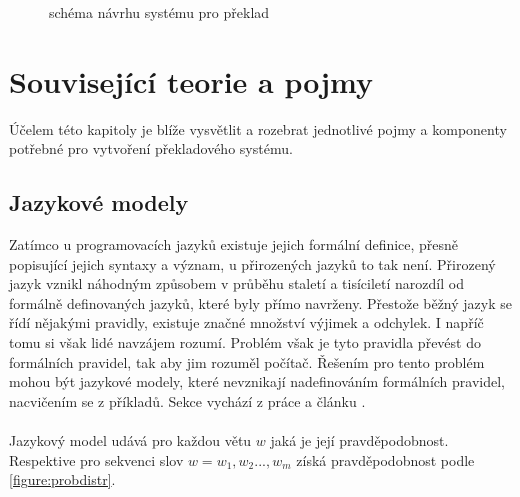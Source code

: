 \begin{figure}[h]
    \begin{center}
    \end{center}
	\caption{schéma návrhu systému pro překlad}
	\label{img:draft}
\end{figure}


\chapter{Související teorie a pojmy}
Účelem této kapitoly je blíže vysvětlit a rozebrat jednotlivé pojmy a komponenty potřebné pro vytvoření překladového systému.



\section{Jazykové modely}\label{section:langmodel}
Zatímco u programovacích jazyků existuje jejich formální definice, přesně popisující jejich syntaxy a význam, u přirozených jazyků to tak není. Přirozený jazyk vznikl náhodným způsobem v průběhu staletí a tisíciletí narozdíl od formálně definovaných jazyků, které byly přímo navrženy. Přestože běžný jazyk se řídí nějakými pravidly, existuje značné množství výjimek a odchylek. I napříč tomu si však lidé navzájem rozumí. Problém však je tyto pravidla převést do formálních pravidel, tak aby jim rozuměl počítač. Řešením pro tento problém mohou být jazykové modely, které nevznikají nadefinováním formálních pravidel, nacvičením se z příkladů. Sekce vychází z práce \cite{nmtThesis} a článku \cite{nmtTutorial}.
\\\\
Jazykový model udává pro každou větu $w$ jaká je její pravděpodobnost. Respektive pro sekvenci slov $w = w_1, w_2..., w_m$ získá pravděpodobnost podle \ref{figure:probdistr}.

